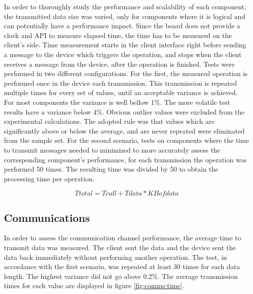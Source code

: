 In order to thoroughly study the performance and scalability of each component, the transmitted data size was varied, only for components where it is logical and can potentially have a performance impact.
Since the board does not provide a clock and \ac{API} to measure elapsed time, the time has to be measured on the client's side.
Time measurement starts in the client interface right before sending a message to the device which triggers the operation, and stops when the client receives a message from the device, after the operation is finished.
Tests were performed in two different configurations.
For the first, the measured operation is performed once in the device each transmission. This transmission is repeated multiple times for every set of values, until an acceptable variance is achieved. For most components the variance is well bellow 1\%. The more volatile test results have a variance below 4\%.
Obvious outlier values were excluded from the experimental calculations. The adopted rule was that values which are significantly above or below the average, and are never repeated were eliminated from the sample set.
For the second scenario, tests on components where the time to transmit messages needed to minimized to more accurately assess the corresponding component's performance, for each transmission the operation was performed 50 times. The resulting time was divided by 50 to obtain the processing time per operation.

\begin{equation}
	\label{eq:linear-eq}
	Ttotal = Tcall + Tdata * KB of data
\end{equation}





\subsection{Communications}\label{chap:evaluation:performance:comms}

In order to assess the communication channel performance, the average time to transmit data was measured. The client sent the data and the device sent the data back immediately without performing another operation. The test, in accordance with the first scenario, was repeated at least 30 times for each data length. The highest variance did not go above 0.2\%.
The average transmission times for each value are displayed in figure \ref{fig:comms:time}.

